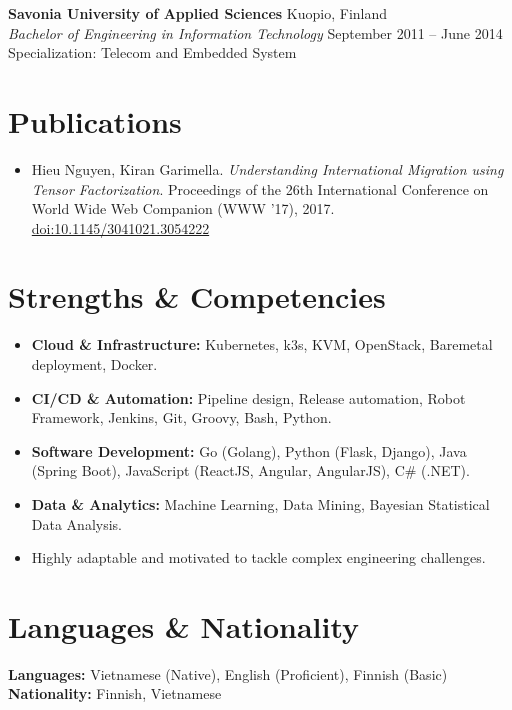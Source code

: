 \documentclass[10pt,a4paper]{article}
\begin{document}
\vspace{2pt}
\textbf{Savonia University of Applied Sciences} \hfill Kuopio, Finland \\
\textit{Bachelor of Engineering in Information Technology} \hfill September 2011 -- June 2014 \\
Specialization: Telecom and Embedded System

\section*{Publications}
\small
\begin{itemize}
    \item Hieu Nguyen, Kiran Garimella. \textit{Understanding International Migration using Tensor Factorization}. Proceedings of the 26th International Conference on World Wide Web Companion (WWW '17), 2017. \href{https://doi.org/10.1145/3041021.3054222}{doi:10.1145/3041021.3054222}
\end{itemize}

\section*{Strengths \& Competencies}
\small
\begin{itemize}
    \item \textbf{Cloud \& Infrastructure:} Kubernetes, k3s, KVM, OpenStack, Baremetal deployment, Docker.
    \item \textbf{CI/CD \& Automation:} Pipeline design, Release automation, Robot Framework, Jenkins, Git, Groovy, Bash, Python.
    \item \textbf{Software Development:} Go (Golang), Python (Flask, Django), Java (Spring Boot), JavaScript (ReactJS, Angular, AngularJS), C\# (.NET).
    \item \textbf{Data \& Analytics:} Machine Learning, Data Mining, Bayesian Statistical Data Analysis.
    \item Highly adaptable and motivated to tackle complex engineering challenges.
\end{itemize}

\section*{Languages \& Nationality}
\small
\textbf{Languages:} Vietnamese (Native), English (Proficient), Finnish (Basic) \hfill \textbf{Nationality:} Finnish, Vietnamese
\end{document}
